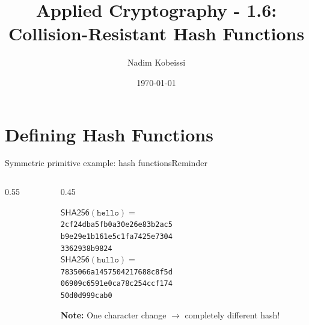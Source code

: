 \ifdefined\PRESENTATION\else\PassOptionsToClass{handout}{beamer}\fi\documentclass[aspectratio=169, lualatex]{beamer}
\title{Applied Cryptography - 1.6: Collision-Resistant Hash Functions}
\author{Nadim Kobeissi}
\institute{Symbolic Software}
\date{\today}
\begin{document}
\begin{frame}[plain]
	\titlepage
\end{frame}

\section{Defining Hash Functions}

\begin{frame}{Symmetric primitive example: hash functions}{Reminder}
	\begin{columns}[c]
		\begin{column}{0.55\textwidth}
		\end{column}
		\begin{column}{0.45\textwidth}
			\begin{tcolorbox}
				[colback=black!5!white,colframe=ciphergray] $\mathsf{SHA256}(\texttt{hello}) =$ \\ {\small\texttt{2cf24dba5fb0a30e26e83b2ac5}\\ \texttt{b9e29e1b161e5c1fa7425e7304}\\
					\texttt{3362938b9824}}\\[0.6em]
				$\mathsf{SHA256}(\texttt{hullo}) =$ \\ {\small\texttt{7835066a1457504217688c8f5d}\\
					\texttt{06909c6591e0ca78c254ccf174}\\ \texttt{50d0d999cab0}}
			\end{tcolorbox}
			\textcolor{cipherprimary}{\textbf{Note:} \small One character change $\rightarrow$
				completely different hash!}
		\end{column}
	\end{columns}
\end{frame}
\end{document}
